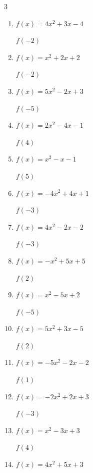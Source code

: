 \begin{multicols}{3}
\begin{enumerate}
$f(-2)$
        \phantom{$= -14$}

  \item $f(x)=4x^{2}+3x-4$

$f(-2)$
        \phantom{$= 6$}

  \item $f(x)=x^{2}+2x+2$

$f(-2)$
        \phantom{$= 2$}

  \item $f(x)=5x^{2}-2x+3$

$f(-5)$
        \phantom{$= 138$}

  \item $f(x)=2x^{2}-4x-1$

$f(4)$
        \phantom{$= 15$}

  \item $f(x)=x^{2}-x-1$

$f(5)$
        \phantom{$= 19$}

  \item $f(x)=-4x^{2}+4x+1$

$f(-3)$
        \phantom{$= -47$}

\columnbreak %

  \item $f(x)=4x^{2}-2x-2$

$f(-3)$
        \phantom{$= 40$}

  \item $f(x)=-x^{2}+5x+5$

$f(2)$
        \phantom{$= 11$}

  \item $f(x)=x^{2}-5x+2$

$f(-5)$
        \phantom{$= 52$}

  \item $f(x)=5x^{2}+3x-5$

$f(2)$
        \phantom{$= 21$}

  \item $f(x)=-5x^{2}-2x-2$

$f(1)$
        \phantom{$= -9$}

  \item $f(x)=-2x^{2}+2x+3$

$f(-3)$
        \phantom{$= -21$}

  \item $f(x)=x^{2}-3x+3$

$f(4)$
        \phantom{$= 7$}

  \item $f(x)=4x^{2}+5x+3$


\end{enumerate}
\end{multicols}
